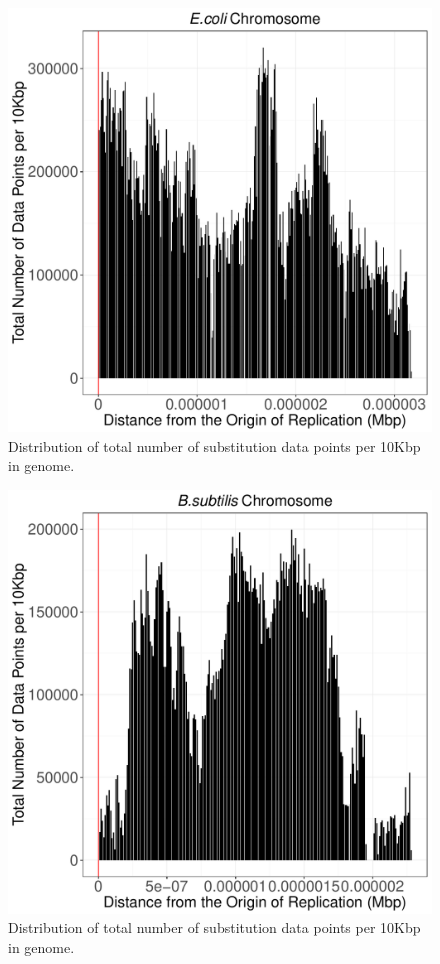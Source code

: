\documentclass[12pt]{article}
\begin{document}
\begin{figure}
	\includegraphics[width=0.9\linewidth]{./ecoli_total_num_sites_graph.pdf}
	\caption{\label{fig:ecoli_tot_sites} Distribution of total number of  substitution  data points per 10Kbp in genome.}
\end{figure}

\begin{figure}
	\includegraphics[width=0.9\linewidth]{./bass_total_num_sites_graph.pdf}
	\caption{\label{fig:bass_tot_sites} Distribution of total number of substitution  data points per 10Kbp in genome.}
\end{figure}
\end{document}
